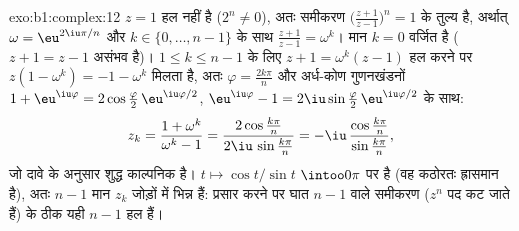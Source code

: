 \begin{solution}{exo:b1:complex:12}
$z = 1$ हल नहीं है ($2^n \neq 0$), अतः समीकरण $\bigl(\frac{z+1}{z-1}\bigr)^n
= 1$ के तुल्य है, अर्थात् $\omega = \eu^{2\iu\pi/n}$ और $k \in \{0, \dots,
n-1\}$ के साथ $\frac{z+1}{z-1} = \omega^k$। मान $k = 0$ वर्जित है ($z + 1 =
z - 1$ असंभव है)। $1 \leq k \leq n - 1$ के लिए $z + 1 = \omega^k(z - 1)$ हल
करने पर $z(1 - \omega^k) = -1 - \omega^k$ मिलता है, अतः $\varphi =
\frac{2k\pi}{n}$ और अर्ध-कोण गुणनखंडनों $1 + \eu^{\iu\varphi} =
2\cos\frac\varphi2\, \eu^{\iu\varphi/2}$, $\eu^{\iu\varphi} - 1 =
2\iu\sin\frac\varphi2 \,\eu^{\iu\varphi/2}$ के साथ:
\[
z_k = \frac{1 + \omega^k}{\omega^k - 1}
= \frac{2\cos\frac{k\pi}{n}}{2\iu\,\sin\frac{k\pi}{n}}
= -\iu\,\frac{\cos\frac{k\pi}{n}}{\sin\frac{k\pi}{n}} ,
\]
जो दावे के अनुसार शुद्ध काल्पनिक है।  $t \mapsto \cos t/\sin t$
$\intoo0\pi$ पर  है (वह कठोरतः ह्रासमान है), अतः $n - 1$ मान $z_k$
जोड़ों में भिन्न हैं: प्रसार करने पर घात $n - 1$ वाले समीकरण ($z^n$ पद कट
जाते हैं) के ठीक यही $n - 1$ हल हैं।
\end{solution}

